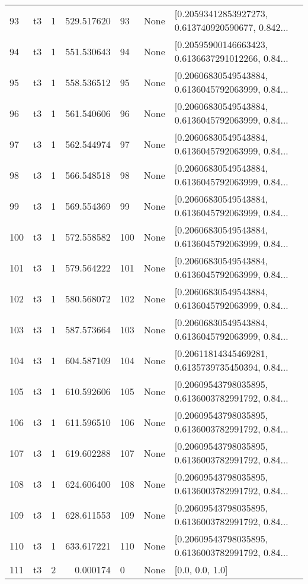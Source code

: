 \begin{tabular}{lllrlll}
93  &  t3 &   1 &  529.517620 &   93 &  None &  [0.20593412853927273, 0.613740920590677, 0.842... \\
94  &  t3 &   1 &  551.530643 &   94 &  None &  [0.20595900146663423, 0.6136637291012266, 0.84... \\
95  &  t3 &   1 &  558.536512 &   95 &  None &  [0.20606830549543884, 0.6136045792063999, 0.84... \\
96  &  t3 &   1 &  561.540606 &   96 &  None &  [0.20606830549543884, 0.6136045792063999, 0.84... \\
97  &  t3 &   1 &  562.544974 &   97 &  None &  [0.20606830549543884, 0.6136045792063999, 0.84... \\
98  &  t3 &   1 &  566.548518 &   98 &  None &  [0.20606830549543884, 0.6136045792063999, 0.84... \\
99  &  t3 &   1 &  569.554369 &   99 &  None &  [0.20606830549543884, 0.6136045792063999, 0.84... \\
100 &  t3 &   1 &  572.558582 &  100 &  None &  [0.20606830549543884, 0.6136045792063999, 0.84... \\
101 &  t3 &   1 &  579.564222 &  101 &  None &  [0.20606830549543884, 0.6136045792063999, 0.84... \\
102 &  t3 &   1 &  580.568072 &  102 &  None &  [0.20606830549543884, 0.6136045792063999, 0.84... \\
103 &  t3 &   1 &  587.573664 &  103 &  None &  [0.20606830549543884, 0.6136045792063999, 0.84... \\
104 &  t3 &   1 &  604.587109 &  104 &  None &  [0.20611814345469281, 0.6135739735450394, 0.84... \\
105 &  t3 &   1 &  610.592606 &  105 &  None &  [0.20609543798035895, 0.6136003782991792, 0.84... \\
106 &  t3 &   1 &  611.596510 &  106 &  None &  [0.20609543798035895, 0.6136003782991792, 0.84... \\
107 &  t3 &   1 &  619.602288 &  107 &  None &  [0.20609543798035895, 0.6136003782991792, 0.84... \\
108 &  t3 &   1 &  624.606400 &  108 &  None &  [0.20609543798035895, 0.6136003782991792, 0.84... \\
109 &  t3 &   1 &  628.611553 &  109 &  None &  [0.20609543798035895, 0.6136003782991792, 0.84... \\
110 &  t3 &   1 &  633.617221 &  110 &  None &  [0.20609543798035895, 0.6136003782991792, 0.84... \\
111 &  t3 &   2 &    0.000174 &    0 &  None &                                    [0.0, 0.0, 1.0] \\

\end{tabular}
